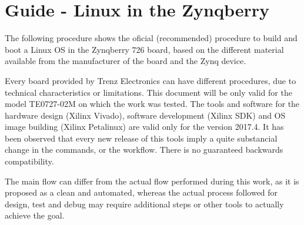 

\chapter{Guide - Linux in the Zynqberry} \label{appen1}

The following procedure shows the oficial (recommended) procedure to build and boot a Linux OS in the Zynqberry 726 board, based on the different material available from the manufacturer of the board and the Zynq device.

Every board provided by Trenz Electronics can have different procedures, due to technical characteristics or limitations. This document will be only valid for the model TE0727-02M on which the work was tested. The tools and software for the hardware design (Xilinx Vivado), software development (Xilinx SDK) and OS image building (Xilinx Petalinux) are valid only for the version 2017.4. It has been observed that every new release of this tools imply a quite substancial change in the commands, or the workflow. There is no guaranteed backwards compatibility.

The main flow can differ from the actual flow performed during this work, as it is proposed as a clean and automated, whereas the actual process followed for design, test and debug may require additional steps or other tools to actually achieve the goal.

